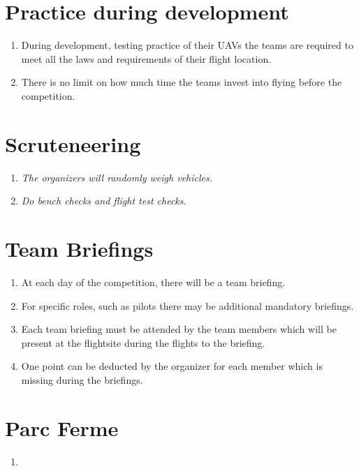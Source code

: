     \section{Practice during development}
    \begin{enumerate}
      \item During development, testing practice of their UAVs the teams are required to meet all the laws and requirements of their flight location. 
      \item There is no limit on how much time the teams invest into flying before the competition. 
    \end{enumerate}

    \section{Scruteneering}
    \begin{enumerate}
      \item \emph{The organizers will randomly weigh vehicles.}
      \item \emph{Do bench checks and flight test checks.}
    \end{enumerate}

    \section{Team Briefings}
    \begin{enumerate}
      \item At each day of the competition, there will be a team briefing.
      \item For specific roles, such as pilots there may be additional mandatory briefings.
      \item Each team briefing must be attended by the team members which will be present at the flightsite during the flights to the briefing.
      \item One point can be deducted by the organizer for each member which is missing during the briefings.
    \end{enumerate}

    \section{Parc Ferme}
    \begin{enumerate}
      \item 
    \end{enumerate}

